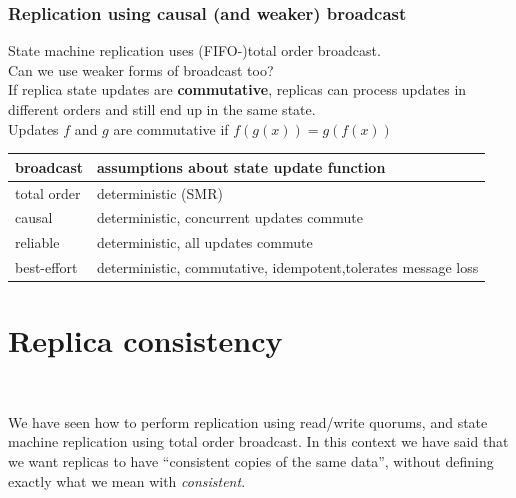 \begin{frame}
    \label{s:causal-replication}
    \frametitle{Replication using causal (and weaker) broadcast}
    State machine replication uses (FIFO-)total order broadcast.\\
    Can we use weaker forms of broadcast too?\\[1em]\pause
    If replica state updates are \textbf{commutative}, replicas can process updates in different orders and still end up in the same state.\\[1em]
    Updates $f$ and $g$ are commutative if $f(g(x)) = g(f(x))$\\\pause
    \renewcommand{\arraystretch}{1.3}
    \begin{tabular}{l|p{8cm}}
        \hline
        \textbf{broadcast} & \textbf{assumptions about state update function} \\\hline
        total order & deterministic (SMR) \pause\\
        causal & deterministic, concurrent updates commute \pause\\
        reliable & deterministic, all updates commute \pause\\
        best-effort & deterministic, commutative, idempotent,\newline tolerates message loss \\\hline
    \end{tabular}
\end{frame}
\label{l:causal-replication}



\section{Replica consistency}\label{sec:consistency}

\begin{frame}
    \begin{center}
        {\Large{\color{darkblue}{Replica consistency}}} \\[2em]
        \mydetails
    \end{center}
\end{frame}

We have seen how to perform replication using read/write quorums, and state machine replication using total order broadcast.
In this context we have said that we want replicas to have ``consistent copies of the same data'', without defining exactly what we mean with \emph{consistent}.

